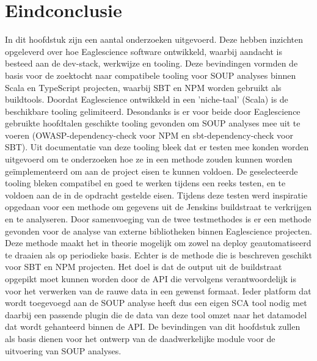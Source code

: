 \section{Eindconclusie}\label{sec:Eindconclusie}
In dit hoofdstuk zijn een aantal onderzoeken uitgevoerd. Deze hebben inzichten opgeleverd over hoe Eaglescience software ontwikkeld, waarbij aandacht is besteed aan de dev-stack, werkwijze en tooling. Deze bevindingen vormden de basis voor de zoektocht naar compatibele tooling voor SOUP analyses binnen Scala en TypeScript projecten, waarbij SBT en NPM worden gebruikt als buildtools. Doordat Eaglescience ontwikkeld in een 'niche-taal' (Scala) is de beschikbare tooling gelimiteerd. Desondanks is er voor beide door Eaglescience gebruikte hoofdtalen geschikte tooling gevonden om SOUP analyses mee uit te voeren (OWASP-dependency-check voor NPM en sbt-dependency-check voor SBT). Uit documentatie van deze tooling bleek dat er testen mee konden worden uitgevoerd om te onderzoeken hoe ze in een methode zouden kunnen worden geïmplementeerd om aan de project eisen te kunnen voldoen. De geselecteerde tooling bleken compatibel en goed te werken tijdens een reeks testen, en te voldoen aan de in de opdracht gestelde eisen. Tijdens deze testen werd inspiratie opgedaan voor een methode om gegevens uit de Jenskins buildstraat te verkrijgen en te analyseren. Door samenvoeging van de twee testmethodes is er een methode gevonden voor de analyse van externe bibliotheken binnen Eaglescience projecten. Deze methode maakt het in theorie mogelijk om zowel na deploy geautomatiseerd te draaien als op periodieke basis. Echter is de methode die is beschreven geschikt voor SBT en NPM projecten. Het doel is dat de output uit de buildstraat opgepikt moet kunnen worden door de API die vervolgens verantwoordelijk is voor het verwerken van de rauwe data in een gewenst formaat. Ieder platform dat wordt toegevoegd aan de SOUP analyse heeft dus een eigen SCA tool nodig met daarbij een passende plugin die de data van deze tool omzet naar het datamodel dat wordt gehanteerd binnen de API. De bevindingen van dit hoofdstuk zullen als basis dienen voor het ontwerp van de daadwerkelijke module voor de uitvoering van SOUP analyses.
